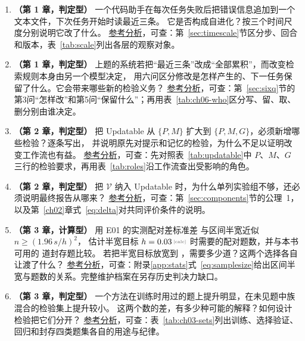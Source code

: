 \begin{enumerate}[label=G\arabic*.]

  \item\label{ex:g01} \textbf{（第 1 章，判定型）}
        一个代码助手在每次任务失败后把错误信息追加到一个文本文件，下次任务开始时读最近三条。
        它是否构成自进化？按三个时间尺度分别说明它改了什么。
        \hyperref[sol:g01]{参考分析}，可查：第~\ref{sec:timescale}节区分步、回合和版本，表~\ref{tab:scale}列出各层的观察对象。

  \item\label{ex:g02} \textbf{（第 1 章，判定型）}
        上题的系统若把“最近三条”改成“全部累积”，而改变检索规则本身由另一个模型决定，
        用六问区分修改是怎样产生的、下一任务保留了什么。它会带来哪些新的检验义务？
        \hyperref[sol:g02]{参考分析}，可查：第~\ref{sec:sixq}节的第3问“怎样改”和第5问“保留什么”；再用表~\ref{tab:ch06-who}区分写、留、取、删分别由谁决定。

  \item\label{ex:g03} \textbf{（第 2 章，判定型）}
        把 Updatable 从 $\{P,M\}$ 扩大到 $\{P,M,G\}$，必须新增哪些检验？逐条写出，
        并说明原先对提示和记忆的检验，为什么不足以证明改变工作流也有益。
        \hyperref[sol:g03]{参考分析}，可查：先对照表~\ref{tab:updatable}中 $P$、$M$、$G$ 三行的检验要求，再用表~\ref{tab:roles}沿工作流查出受影响的角色。

  \item\label{ex:g04} \textbf{（第 2 章，判定型）}
        把 $\mathcal V$ 纳入 Updatable 时，为什么单列实验组不够，还必须说明最终报告从哪来？
        \hyperref[sol:g04]{参考分析}，可查：第~\ref{sec:components}节的公理~1，以及第~\ref{ch02}章式~\eqref{eq:delta}对共同评价条件的说明。

  \item\label{ex:g05} \textbf{（第 3 章，计算型）}
        用 E01 的实测配对差标准差  与区间半宽近似 $n\ge(1.96\,s/h)^{2}$，
        估计半宽目标 $h=\calcnum{0.03}$ 时需要的配对题数，并与本书可用的  道封存题比较。
        若把半宽目标放宽到 ，需要多少道？这两个选择各自让渡了什么？
        \hyperref[sol:g05]{参考分析}，可查：附录\ref{app:stats}式~\eqref{eq:samplesize}给出区间半宽与题数的关系。完整维护档案在另存历史判决力缺口。

  \item\label{ex:g06} \textbf{（第 3 章，判定型）}
        一个方法在训练时用过的题上提升明显，在未见题中族混合的检验集上提升较小。
        这两个数的差，有多少种可能的解释？如何设计检验把它们分开？
        \hyperref[sol:g06]{参考分析}，可查：表~\ref{tab:ch03-sets}列出训练、选择验证、回归和封存四类题集各自的用途与纪律。


\end{enumerate}
